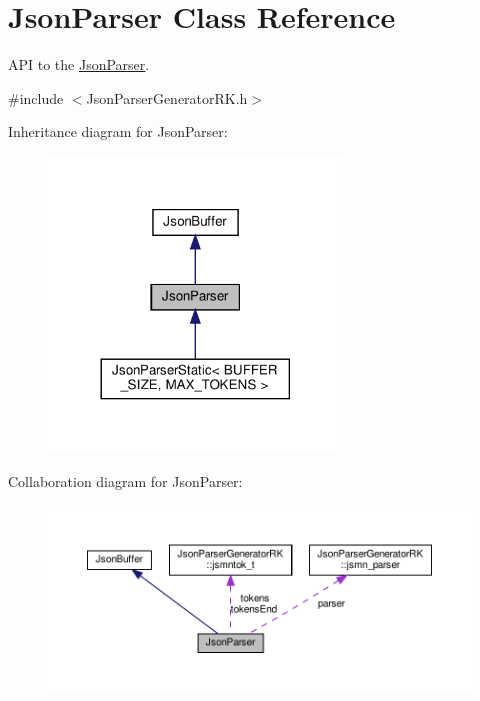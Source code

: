 \hypertarget{class_json_parser}{}\section{Json\+Parser Class Reference}
\label{class_json_parser}


A\+PI to the \hyperlink{class_json_parser}{Json\+Parser}.  




{\ttfamily \#include $<$Json\+Parser\+Generator\+R\+K.\+h$>$}



Inheritance diagram for Json\+Parser\+:\nopagebreak
\begin{figure}[H]
\begin{center}
\leavevmode
\includegraphics[width=221pt]{class_json_parser__inherit__graph}
\end{center}
\end{figure}


Collaboration diagram for Json\+Parser\+:\nopagebreak
\begin{figure}[H]
\begin{center}
\leavevmode
\includegraphics[width=350pt]{class_json_parser__coll__graph}
\end{center}
\end{figure}
